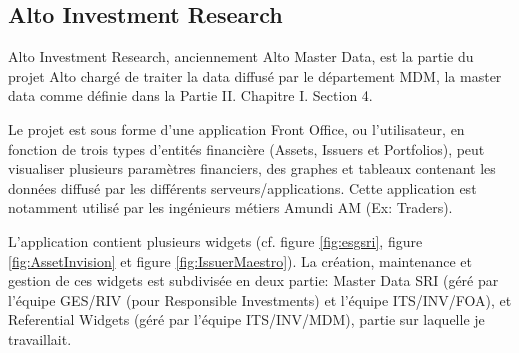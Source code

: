 \subsection{Alto Investment Research}
\par Alto Investment Research, anciennement Alto Master Data, est la partie du projet Alto chargé de traiter la data diffusé par le département MDM, la master data comme définie dans la Partie II. Chapitre I. Section 4.
\par Le projet est sous forme d'une application Front Office, ou l'utilisateur, en fonction de trois types d'entités financière (Assets, Issuers et Portfolios), peut visualiser plusieurs paramètres financiers, des graphes et tableaux contenant les données diffusé par les différents serveurs/applications. Cette application est notamment utilisé par les ingénieurs métiers Amundi AM (Ex: Traders).
\par L'application contient plusieurs widgets (cf. figure \ref{fig:esgsri}, figure \ref{fig:AssetInvision} et figure \ref{fig:IssuerMaestro}). La création, maintenance et gestion de ces widgets est subdivisée en deux partie: Master Data SRI (géré par l'équipe GES/RIV (pour Responsible Investments) et l'équipe ITS/INV/FOA), et Referential Widgets (géré par l'équipe ITS/INV/MDM), partie sur laquelle je travaillait.

